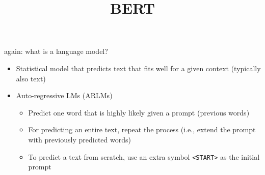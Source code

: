 



\newcommand{\titlefigure}{figure/arlm-mlm.png}
\newcommand{\learninggoals}{
\item Understand the concept of self-supervision
\item Gain ability to distinguish different types of language models}

\title{BERT}
\date{}




\begin{vbframe}{again: what is a language model?}

\vfill

\begin{itemize}
	\item Statistical model that predicts text that fits well for a given context (typically also text)
	\item Auto-regressive LMs (ARLMs)
	\begin{itemize}
		\item Predict one word that is highly likely given a prompt (previous words)
		\item For predicting an entire text, repeat the process (i.e., extend the prompt with previously predicted words)
		\item To predict a text from scratch, use an extra symbol \texttt{<START>} as the initial prompt
	\end{itemize}
\end{itemize}

\vfill

\end{vbframe}



